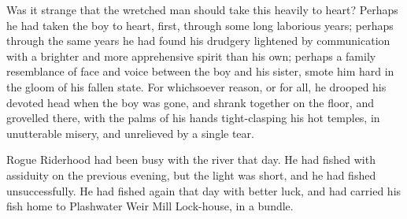 Was it strange that the wretched man should take this heavily to
heart? Perhaps he had taken the boy to heart, first, through some
long laborious years; perhaps through the same years he had found
his drudgery lightened by communication with a brighter and more
apprehensive spirit than his own; perhaps a family resemblance of face
and voice between the boy and his sister, smote him hard in the gloom
of his fallen state. For whichsoever reason, or for all, he drooped his
devoted head when the boy was gone, and shrank together on the floor,
and grovelled there, with the palms of his hands tight-clasping his hot
temples, in unutterable misery, and unrelieved by a single tear.


Rogue Riderhood had been busy with the river that day. He had fished
with assiduity on the previous evening, but the light was short, and
he had fished unsuccessfully. He had fished again that day with better
luck, and had carried his fish home to Plashwater Weir Mill Lock-house,
in a bundle.



